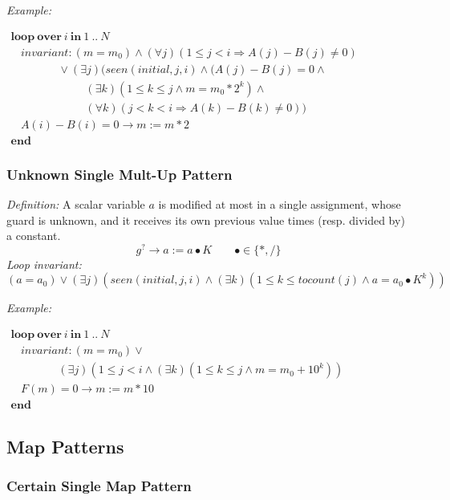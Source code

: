 \documentclass[a4paper,10pt]{article}
\newcommand{\idx}{\ensuremath{i}\xspace}
\newcommand{\idxinitial}{\ensuremath{\mathit{initial}}\xspace}
\newcommand{\KWloop}{\ensuremath{\mathrm{\textbf{loop}}~}}
\newcommand{\KWend}{\ensuremath{\mathrm{\textbf{end}}~}}
\newcommand{\KWover}{\ensuremath{\mathrm{\textbf{over}}~}}
\newcommand{\KWin}{\ensuremath{~\mathrm{\textbf{in}}~}}
\newcommand{\impl}{\ensuremath{\Longrightarrow}}
\newcommand{\seen}[3]{\ensuremath{\mathit{seen}{(#1,#2,#3)}}\xspace}
\newcommand{\tocount}[1]{\ensuremath{\mathit{tocount}(#1)}\xspace}
\newcommand{\loopinvariant}{\noindent\textit{Loop invariant:}\xspace}
\newcommand{\patterndef}{\noindent\textit{Definition:}\xspace}
\newcommand{\patternexample}{\noindent\textit{Example:}\xspace}
\begin{document}
\bigskip
\patternexample

\medskip
$\begin{array}{l}
  \KWloop \KWover i \KWin 1~..~N \\
  ~~~~ \textit{invariant}: (m = m_0) \land (\forall j)(1 \leq j < i \impl A(j)-B(j)\neq0)\\
  ~~~~~~~~~~~~~~~~~~~ \lor (\exists j)(\seen{\idxinitial}{j}{\idx} \land (A(j)-B(j)= 0 \land \\
  ~~~~~~~~~~~~~~~~~~~~~~~~~~~~~~ (\exists k)(1 \leq k \leq j \land m = m_0 * 2^k) \land\\
  ~~~~~~~~~~~~~~~~~~~~~~~~~~~~~~ (\forall k)(j < k < i \impl A(k)-B(k)\neq0))\\
  ~~~~ A(i)-B(i)=0 \rightarrow m := m*2\\
  \KWend
\end{array}$

\subsubsection*{Unknown Single Mult-Up Pattern}

\patterndef A scalar variable $a$ is modified at most in a single assignment, whose
guard is unknown, and it receives its own previous value times
(resp. divided by) a constant.
%
$$g^? \rightarrow a := a \bullet K  \qquad \bullet \in \{*, / \}$$
%
\loopinvariant
%
$$(a = a_0) \lor (\exists j)(\seen{\idxinitial}{j}{\idx} \land (\exists k)(1 \leq k \leq \tocount{j} \land a = a_0 \bullet K^k))$$

\bigskip
\patternexample

\medskip
$\begin{array}{l}
  \KWloop \KWover i \KWin 1~..~N \\
  ~~~~ \textit{invariant}: (m = m_0) \lor \\
  ~~~~~~~~~~~~~~~~~~~ (\exists j)(1 \leq j < i \land (\exists k)(1 \leq k \leq j \land m = m_0+10^k))\\
  ~~~~ F(m)=0 \rightarrow m := m*10\\
  \KWend
\end{array}$

\subsection{Map Patterns}

\subsubsection*{Certain Single Map Pattern}
\end{document}
